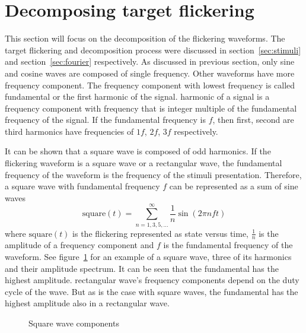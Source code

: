 
\section{Decomposing target flickering}
\label{sec:decomposition}

This section will focus on the decomposition of the \glspl{flickering waveform}. The \gls{target} \gls{flickering} and decomposition process were discussed in section~\ref{sec:stimuli} and section~\ref{sec:fourier} respectively. As discussed in previous section, only sine and cosine waves are composed of single frequency. Other waveforms have more \gls{frequency component}. The \gls{frequency component} with lowest frequency is called \gls{fundamental} or the first \gls{harmonic} of the signal. \Gls{harmonic} of a signal is a \gls{frequency component} with frequency that is integer multiple of the \gls{fundamental} frequency of the signal. If the \gls{fundamental} frequency is $f$, then first, second are third \glspl{harmonic} have frequencies of $1f$, $2f$, $3f$ respectively.

It can be shown that a \gls{square wave} is composed of odd \glspl{harmonic}. If the \gls{flickering waveform} is a \gls{square wave} or a \gls{rectangular wave}, the \gls{fundamental} frequency of the waveform is the frequency of the stimuli presentation. Therefore, a \gls{square wave} with \gls{fundamental} frequency $f$ can be represented as a sum of sine waves
\begin{equation}
	\label{eq:square}
	\mbox{square}(t) = \sum_{n=1,3,5,\dots}^{\infty}\frac{1}{n} \sin(2\pi nft)
\end{equation}
where $\mbox{square}(t)$ is the \gls{flickering} represented as \gls{state} versus time, $\frac{1}{n}$ is the amplitude of a \gls{frequency component} and $f$ is the \gls{fundamental} frequency of the waveform. See figure~\ref{fig:square_wave} for an example of a square wave, three of its harmonics and their amplitude spectrum. It can be seen that the \gls{fundamental} has the highest amplitude. \Gls{rectangular wave}'s \glspl{frequency component} depend on the \gls{duty cycle} of the wave. But as is the case with \glspl{square wave}, the \gls{fundamental} has the highest amplitude also in a \gls{rectangular wave}.

\begin{figure}[h]
	
	\caption{Square wave components}
	\label{fig:square_wave}
\end{figure}

